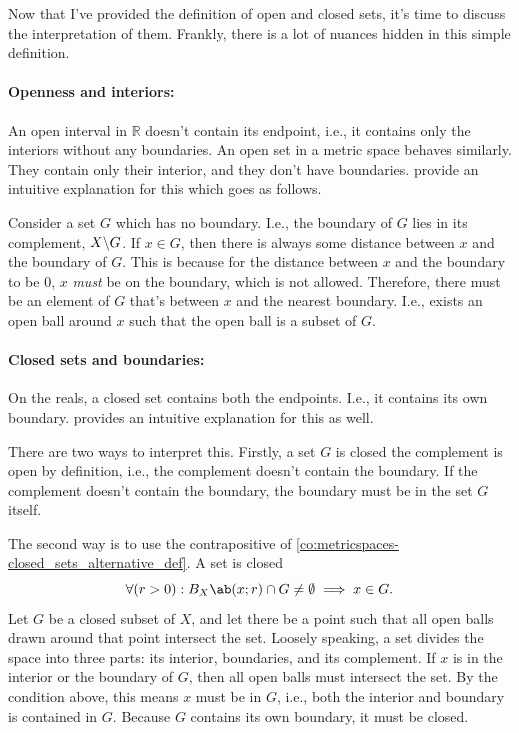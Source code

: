 Now that I've provided the definition of open and closed sets, it's time to discuss
the interpretation of them. Frankly, there is a lot of nuances hidden in this simple definition.

\paragraph{Openness and interiors:}

An open interval in \(\mathbb{R}\) doesn't contain its endpoint, i.e., it contains only
the interiors without any boundaries. An open set in a metric space behaves similarly. They
contain only their interior, and they don't have boundaries. 
provide an intuitive explanation for this which goes as follows.

Consider a set \(G\) which has no boundary. I.e., the boundary of \(G\) lies in its complement,
\(X \backslash G\). If \(x \in G\), then there is always some distance between \(x\) and
the boundary of \(G\). This is because for the distance between \(x\) and the boundary
to be \(0\), \(x\) \emph{must} be on the boundary, which is not allowed. Therefore,
there must be an element of \(G\) that's between \(x\) and the nearest boundary. I.e.,
exists an open ball around \(x\) such that the open ball is a subset of \(G\).

\paragraph{Closed sets and boundaries:}

On the reals, a closed set contains both the endpoints. I.e., it contains its own boundary.
 provides an intuitive explanation
for this as well.

There are two ways to interpret this. Firstly, a set \(G\) is closed \ifft the
complement is open by definition, i.e., the complement doesn't contain the boundary.
If the complement doesn't contain the boundary, the boundary must be in the set \(G\) itself.

The second way is to use the contrapositive of \cref{co:metricspaces-closed_sets_alternative_def}.
A set is closed \ifft
\begin{equation}
  \forall (r > 0) : \oball{X}{x}{r} \cap G \neq \emptyset \implies x \in G.
\end{equation}
Let \(G\) be a closed subset of \(X\), and let there be a point such that all open
balls drawn around that point intersect the set. Loosely speaking, a set divides the
space into three parts: its interior, boundaries, and its complement. If \(x\) is in
the interior or the boundary of \(G\), then all open balls must intersect the set. By
the condition above, this means \(x\) must be in \(G\), i.e., both the interior and
boundary is contained in \(G\). Because \(G\) contains its own boundary, it must be closed.


